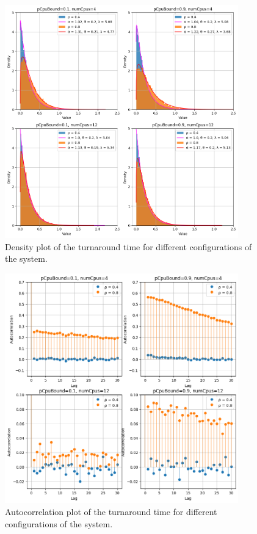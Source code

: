 \begin{figure}
    \captionsetup{type=figure}
    \centering
    \includegraphics[width=0.9\textwidth]{./images/04/fcfs/density.png}
    \caption{Density plot of the turnaround time for different configurations of the system.}
    \label{fig:fcfs_density}
\end{figure}

\begin{figure}
    \captionsetup{type=figure}
    \centering
    \includegraphics[width=0.9\textwidth]{./images/04/fcfs/autocorrelation.png}
    \caption{Autocorrelation plot of the turnaround time for different configurations of the system.}
    \label{fig:fcfs_autocorrelation}
\end{figure}

